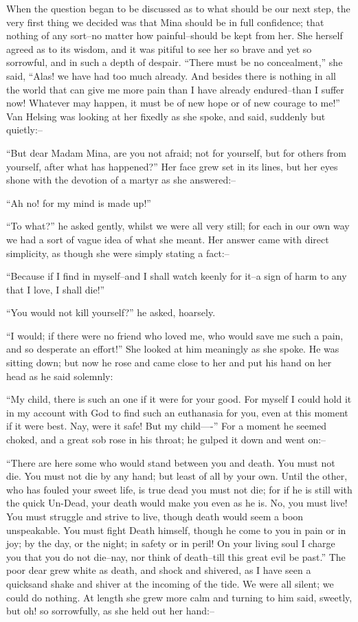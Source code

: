 \documentclass[12pt,openright]{book}
\begin{document}
When the question began to be discussed as to what should be our next step, the very first thing we decided was that Mina should be in full confidence; that nothing of any sort–no matter how painful–should be kept from her. She herself agreed as to its wisdom, and it was pitiful to see her so brave and yet so sorrowful, and in such a depth of despair. “There must be no concealment,” she said, “Alas! we have had too much already. And besides there is nothing in all the world that can give me more pain than I have already endured–than I suffer now! Whatever may happen, it must be of new hope or of new courage to me!” Van Helsing was looking at her fixedly as she spoke, and said, suddenly but quietly:–

“But dear Madam Mina, are you not afraid; not for yourself, but for others from yourself, after what has happened?” Her face grew set in its lines, but her eyes shone with the devotion of a martyr as she answered:–

“Ah no! for my mind is made up!”

“To what?” he asked gently, whilst we were all very still; for each in our own way we had a sort of vague idea of what she meant. Her answer came with direct simplicity, as though she were simply stating a fact:–

“Because if I find in myself–and I shall watch keenly for it–a sign of harm to any that I love, I shall die!”

“You would not kill yourself?” he asked, hoarsely.

“I would; if there were no friend who loved me, who would save me such a pain, and so desperate an effort!” She looked at him meaningly as she spoke. He was sitting down; but now he rose and came close to her and put his hand on her head as he said solemnly:

“My child, there is such an one if it were for your good. For myself I could hold it in my account with God to find such an euthanasia for you, even at this moment if it were best. Nay, were it safe! But my child—-” For a moment he seemed choked, and a great sob rose in his throat; he gulped it down and went on:–

“There are here some who would stand between you and death. You must not die. You must not die by any hand; but least of all by your own. Until the other, who has fouled your sweet life, is true dead you must not die; for if he is still with the quick Un-Dead, your death would make you even as he is. No, you must live! You must struggle and strive to live, though death would seem a boon unspeakable. You must fight Death himself, though he come to you in pain or in joy; by the day, or the night; in safety or in peril! On your living soul I charge you that you do not die–nay, nor think of death–till this great evil be past.” The poor dear grew white as death, and shock and shivered, as I have seen a quicksand shake and shiver at the incoming of the tide. We were all silent; we could do nothing. At length she grew more calm and turning to him said, sweetly, but oh! so sorrowfully, as she held out her hand:–
\end{document}
